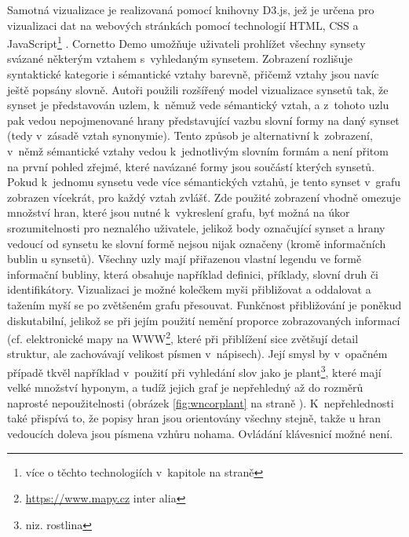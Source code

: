 \documentclass[a4paper, 11pt, oneside, showtrims]{book}
\newcommand{\itNameRef}[1]{\textit{\nameref{#1}}}
\newcommand\ex{\textsf}
\begin{document}
					Samotná vizualizace je realizovaná pomocí knihovny D3.js, jež je určena pro vizualizaci dat na webových stránkách pomocí technologií HTML, CSS a JavaScript\footnote{více o těchto technologiích v~kapitole \itNameRef{cha:techno} na straně \pageref{cha:techno}} \parencite{d3web}. Cornetto Demo umožňuje uživateli prohlížet všechny synsety svázané některým vztahem s~vyhledaným synsetem. Zobrazení rozlišuje syntaktické kategorie i sémantické vztahy barevně, přičemž vztahy jsou navíc ještě popsány slovně. Autoři použili rozšířený model vizualizace synsetů tak, že synset je představován uzlem, k~němuž vede sémantický vztah, a z~tohoto uzlu pak vedou nepojmenované hrany představující vazbu slovní formy na daný synset (tedy v~zásadě vztah synonymie). Tento způsob je alternativní k~zobrazení, v~němž sémantické vztahy vedou k~jednotlivým slovním formám a není přitom na první pohled zřejmé, které navázané formy jsou součástí kterých synsetů. Pokud k~jednomu synsetu vede více sémantických vztahů, je tento synset v~grafu zobrazen vícekrát, pro každý vztah zvlášť. Zde použité zobrazení vhodně omezuje množství hran, které jsou nutné k~vykreslení grafu, byť možná na úkor srozumitelnosti pro neznalého uživatele, jelikož body označující synset a hrany vedoucí od synsetu ke slovní formě nejsou nijak označeny (kromě informačních bublin u synsetů). Všechny uzly mají přiřazenou vlastní legendu ve formě informační bubliny, která obsahuje například definici, příklady, slovní druh či identifikátory. Vizualizaci je možné kolečkem myši přibližovat a oddalovat a tažením myší se po zvětšeném grafu přesouvat. Funkčnost přibližování je poněkud diskutabilní, jelikož se při jejím použití nemění proporce zobrazovaných informací (cf. elektronické mapy na WWW\footnote{\url{https://www.mapy.cz} inter alia}, které při přiblížení sice zvětšují detail struktur, ale zachovávají velikost písmen v~nápisech). Její smysl by v~opačném případě tkvěl například v~použití při vyhledání slov jako je \ex{plant}\footnote{niz. \ex{rostlina}}, které mají velké množství hyponym, a tudíž jejich graf je nepřehledný až do rozměrů naprosté nepoužitelnosti (obrázek \ref{fig:wncorplant} na straně \pageref{fig:wncorplant}). K~nepřehlednosti také přispívá to, že popisy hran jsou orientovány všechny stejně, takže u hran vedoucích doleva jsou písmena vzhůru nohama. Ovládání klávesnicí možné není.
\end{document}
